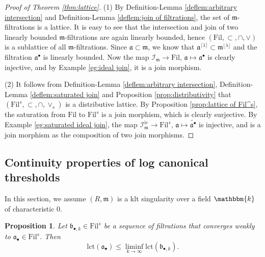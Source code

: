 \documentclass[11pt, leqno]{amsart}%
\theoremstyle{plain}
\newtheorem{proposition}[theorem]{Proposition}
\theoremstyle{definition}
\theoremstyle{remark}
\newcommand{\cI}{\mathcal{I}}
\newcommand{\bR}{\mathbb{R}}
\newcommand{\fa}{\mathfrak{a}}
\newcommand{\fb}{\mathfrak{b}}
\newcommand{\fm}{\mathfrak{m}}
\newcommand{\ic}{\mathrm{ic}}
\newcommand{\lct}{\mathrm{lct}}
\newcommand{\bk}{\mathbbm{k}}
\newcommand{\Fil}{\mathrm{Fil}}
\numberwithin{equation}{section}
\begin{document}
\begin{proof}[Proof of Theorem \ref{thm:lattice}]
    (1) By Definition-Lemma \ref{deflem:arbitrary intersection} and Definition-Lemma \ref{deflem:join of filtrations}, the set of $\fm$-filtrations is a lattice. It is easy to see that the intersection and join of two linearly bounded $\fm$-filtrations are again linearly bounded, hence $(\Fil,\subset,\cap,\vee)$ is a sublattice of all $\fm$-filtrations. Since $\fa\subset\fm$, we know that $\fa^{\lceil\lambda\rceil}\subset\fm^{\lfloor\lambda\rfloor}$ and the filtration $\fa^\bullet$ is linearly bounded. Now the map $\cI_\fm\to\Fil$, $\fa\mapsto\fa^\bullet$ is clearly injective, and by Example \ref{eg:ideal join}, it is a join morphism. 
	
    (2) It follows from Definition-Lemma \ref{deflem:arbitrary intersection}, Definition-Lemma \ref{deflem:saturated join} and Proposition \ref{prop:distributivity} that $(\Fil^s,\subset,\cap,\vee_s)$ is a distributive lattice. By Proposition \ref{prop:lattice of Fil^s}, the saturation from $\Fil$ to $\Fil^s$ is a join morphism, which is clearly surjective. By Example \ref{eg:saturated ideal join}, the map $\cI^{\ic}_{\fm}\to\Fil^s$, $\fa\mapsto\widetilde{\fa^\bullet}$ is injective, and is a join morphism as the composition of two join morphisms. 
\end{proof}






\subsection{Continuity properties of log canonical thresholds}

In this section, we assume $(R,\fm)$ is a klt singularity over a field $\bk$ of characteristic $0$. 

\begin{proposition}\label{prop:lct is weakly lsc}
    Let $\fb_{\bullet,k}\in\Fil^s$ be a sequence of filtrations that converges weakly to $\fa_\bullet\in\Fil^s$. Then
    \begin{equation}\label{eqn:lct is lsc}
        \lct(\fa_\bullet)\le \liminf_{k\to\infty}\lct(\fb_{\bullet,k}).
    \end{equation}
\end{proposition}
\end{document}

